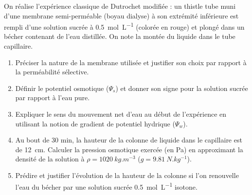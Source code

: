 \documentclass[11pt]{article}
\begin{document}
\begin{exercice}
On réalise l'expérience classique de Dutrochet modifiée : un thistle tube muni d'une membrane semi-perméable (boyau dialyse) à son extrémité inférieure est rempli d'une solution sucrée à \SI{0,5}{mol.L^{-1}} (colorée en rouge) et plongé dans un bécher contenant de l'eau distillée. On note la montée du liquide dans le tube capillaire.
\begin{enumerate}
    \item Préciser la nature de la membrane utilisée et justifier son choix par rapport à la perméabilité sélective.
    \item Définir le potentiel osmotique ($\Psi_s$) et donner son signe pour la solution sucrée par rapport à l'eau pure.
    \item Expliquer le sens du mouvement net d'eau au début de l'expérience en utilisant la notion de gradient de potentiel hydrique ($\Psi_w$).
    \item Au bout de 30 min, la hauteur de la colonne de liquide dans le capillaire est de \SI{12}{cm}. Calculer la pression osmotique exercée (en Pa) en approximant la densité de la solution à $\rho = \SI{1020}{kg.m^{-3}}$ ($g = \SI{9,81}{N.kg^{-1}}$).
    \item Prédire et justifier l'évolution de la hauteur de la colonne si l'on renouvelle l'eau du bécher par une solution sucrée \SI{0,5}{mol.L^{-1}} isotone.
\end{enumerate}
\end{exercice}
\end{document}
